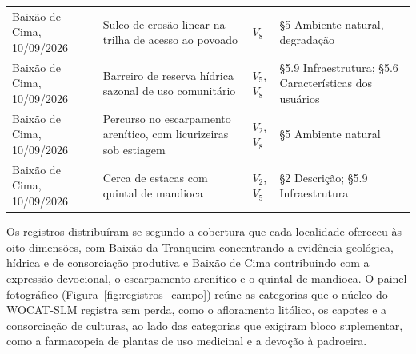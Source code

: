 \begin{table}[H]
\begin{tabular}{p{3.4cm}p{4.4cm}p{1.3cm}p{3.9cm}}
\addlinespace
Baixão de Cima, 10/09/2026 & Sulco de erosão linear na trilha de acesso ao povoado & $V_8$ & §5 Ambiente natural, degradação \\
\addlinespace
Baixão de Cima, 10/09/2026 & Barreiro de reserva hídrica sazonal de uso comunitário & $V_5$, $V_8$ & §5.9 Infraestrutura; §5.6 Características dos usuários \\
\addlinespace
Baixão de Cima, 10/09/2026 & Percurso no escarpamento arenítico, com licurizeiras sob estiagem & $V_2$, $V_8$ & §5 Ambiente natural \\
\addlinespace
Baixão de Cima, 10/09/2026 & Cerca de estacas com quintal de mandioca & $V_2$, $V_5$ & §2 Descrição; §5.9 Infraestrutura \\
\bottomrule
\end{tabular}
\end{table}

Os registros distribuíram-se segundo a cobertura que cada localidade ofereceu às oito dimensões, com Baixão da Tranqueira concentrando a evidência geológica, hídrica e de consorciação produtiva e Baixão de Cima contribuindo com a expressão devocional, o escarpamento arenítico e o quintal de mandioca. O painel fotográfico (Figura~\ref{fig:registros_campo}) reúne as categorias que o núcleo do WOCAT-SLM registra sem perda, como o afloramento litólico, os capotes e a consorciação de culturas, ao lado das categorias que exigiram bloco suplementar, como a farmacopeia de plantas de uso medicinal e a devoção à padroeira.


